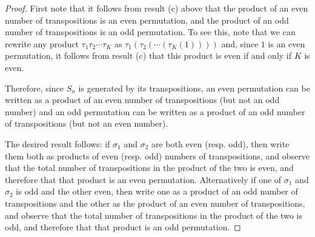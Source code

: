 \begin{proof}
  First note that it follows from result (c) above that the product of an even number of
  transpositions is an even permutation, and the product of an odd number of transpositions is an
  odd permutation. To see this, note that we can rewrite any product $\tau_1\tau_2\cdots\tau_K$
  as $\tau_1(\tau_2(\cdots(\tau_K(1))))$ and, since $1$ is an even permutation, it follows from
  result (c) that this product is even if and only if $K$ is even.

  Therefore, since $S_n$ is generated by its transpositions, an even permutation can be written as
  a product of an even number of transpositions (but not an odd number) and an odd permutation can
  be written as a product of an odd number of transpositions (but not an even number).

  The desired result follows: if $\sigma_1$ and $\sigma_2$ are both even (resp. odd), then write them both as
  products of even (resp. odd) numbers of transpositions, and observe that the total number of
  transpositions in the product of the two is even, and therefore that that product is an even
  permutation. Alternatively if one of $\sigma_1$ and $\sigma_2$ is odd and the other even, then write one as
  a product of an odd number of transpositions and the other as the product of an even number of
  transpositions, and observe that the total number of transpositions in the product of the two is
  odd, and therefore that that product is an odd permutation.
\end{proof}
